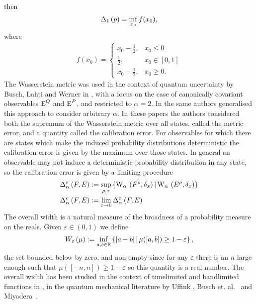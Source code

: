 then 
\begin{align}
  \wsDev{p}[1] = \inf_{x_0} f(x_0),
\end{align}
where
\begin{align}
  f(x_0) = \begin{cases}x_0 - \frac{1}{2}, &x_0 \leq 0\\ \frac{1}{2}, & x_0\in [0,1] \\ x_0 - \frac{1}{2}, & x_0 \geq 0. \end{cases}
\end{align}
The Wasserstein metric was used in the context of quantum uncertainty by Busch, Lahti and Werner in \cite{PhysRevLett.111.160405}, with a focus on the case of canonically covariant observables $\operatorname{E}^Q$ and $\operatorname{E}^P$, and restricted to $\alpha=2$. In \cite{blw-meas-uncertainty} the same authors generalised this approach to consider arbitrary $\alpha$. In these papers the authors considered both the supremum of the Wasserstein metric over all states, called the metric error, and a quantity called the calibration error. For observables for which there are states which make the induced probability distributions deterministic the calibration error is given by the maximum over those states. In general an observable may not induce a deterministic probability distribution in any state, so the calibration error is given by a limiting procedure
\begin{align}
  \calibError{F}{E}{\alpha}[\varepsilon] &\defeq \sup_{\rho,x} \sbuild{\ws{F^\rho,\delta_{x}}[\alpha]}{\ws{E^\rho,\delta_{x}}[\alpha]}\\
  \calibError{F}{E}{\alpha} &\defeq \lim_{\varepsilon\to 0} \calibError{F}{E}{\alpha}[\varepsilon]  
\end{align}
The overall width is a natural measure of the broadness of a probability measure on the reals. Given $\varepsilon\in (0,1)$ we define
\begin{align}
  W_{\varepsilon}\left({\mu}\right) := \inf_{a,b\in\mathbb{R}} \left\{{\left\lvert{a-b}\right\rvert}\,\middle|\,\mu([a,b])\geq 1-\varepsilon\right\}, \label{eqn:overall-width-defn}
\end{align}
the set bounded below by zero, and non-empty since for any $\varepsilon$ there is an $n$ large enough such that $\mu([-n,n])\geq 1-\varepsilon$ so this quantity is a real number. The overall width has been studied in the context of timelimited and bandlimited functions in \cite{6773660}, in the quantum mechanical literature by Uffink \cite{ufink-thesis}, Busch et. al.~\cite{BUSCH2007155} and Miyadera~\cite{doi:10.1063/1.3614503}.

